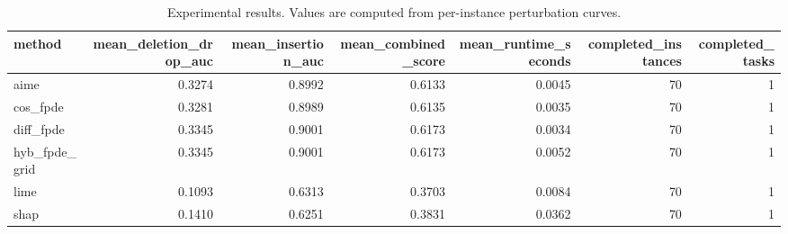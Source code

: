 \begin{table}[t]
\caption{Experimental results. Values are computed from per-instance perturbation curves.}
\label{tab:main_results_computed}
\centering
\begin{tabular}{lrrrrrr}
\toprule
method & mean\_deletion\_drop\_auc & mean\_insertion\_auc & mean\_combined\_score & mean\_runtime\_seconds & completed\_instances & completed\_tasks \\
\midrule
aime & 0.3274 & 0.8992 & 0.6133 & 0.0045 & 70 & 1 \\
cos\_fpde & 0.3281 & 0.8989 & 0.6135 & 0.0035 & 70 & 1 \\
diff\_fpde & 0.3345 & 0.9001 & 0.6173 & 0.0034 & 70 & 1 \\
hyb\_fpde\_grid & 0.3345 & 0.9001 & 0.6173 & 0.0052 & 70 & 1 \\
lime & 0.1093 & 0.6313 & 0.3703 & 0.0084 & 70 & 1 \\
shap & 0.1410 & 0.6251 & 0.3831 & 0.0362 & 70 & 1 \\
\bottomrule
\end{tabular}

\end{table}
